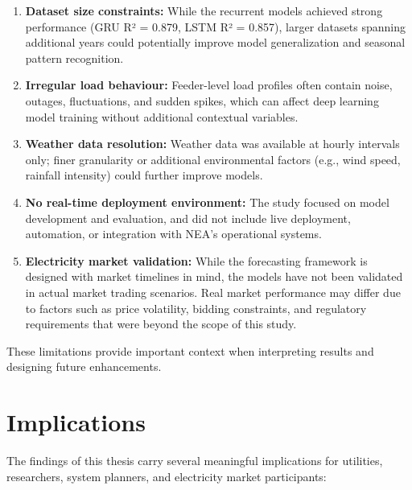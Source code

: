 \documentclass[oneside, 12pt]{book}
\numberwithin{equation}{chapter}
\newcommand{\sizexii}{\fontsize{12pt}{6pt}\selectfont}
\begin{document}
\begin{enumerate}
    \item \textbf{Dataset size constraints:} While the recurrent models achieved strong performance (GRU R² = 0.879, LSTM R² = 0.857), larger datasets spanning additional years could potentially improve model generalization and seasonal pattern recognition.
    
    \item \textbf{Irregular load behaviour:} Feeder-level load profiles often contain noise, outages, fluctuations, and sudden spikes, which can affect deep learning model training without additional contextual variables.
    
    \item \textbf{Weather data resolution:} Weather data was available at hourly intervals only; finer granularity or additional environmental factors (e.g., wind speed, rainfall intensity) could further improve models.
    
    \item \textbf{No real-time deployment environment:} The study focused on model development and evaluation, and did not include live deployment, automation, or integration with NEA's operational systems.
    
    \item \textbf{Electricity market validation:} While the forecasting framework is designed with market timelines in mind, the models have not been validated in actual market trading scenarios. Real market performance may differ due to factors such as price volatility, bidding constraints, and regulatory requirements that were beyond the scope of this study.
\end{enumerate}

These limitations provide important context when interpreting results and designing future enhancements.

\section{\sizexii Implications}

The findings of this thesis carry several meaningful implications for utilities, researchers, system planners, and electricity market participants:
\end{document}
